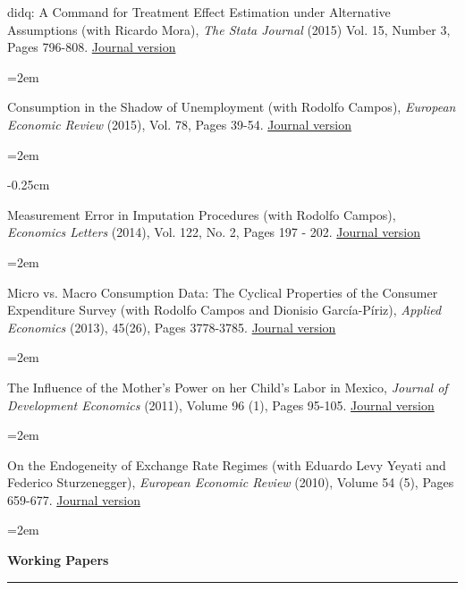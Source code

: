 \documentclass[12pt]{article}
\newcommand{\sepspace}{\vspace*{0.5em}}		%
\newcommand{\NewPart}[1]{ \vspace*{0.4cm} \noindent \large \textbf{#1}
\par \normalsize \normalfont \vspace*{-0.5cm} \noindent\rule{\textwidth}{1.8pt} \vspace*{-0.75cm} }
\newcommand{\EducationEntry}[4]{
		\noindent #1 \hfill      %
		\noindent #2 %
		\par  %
		\noindent \textit{#3} \par        %
		\noindent\hangindent=2em\hangafter=0  #4 %
		\normalsize \par}
\begin{document}
\vspace*{-0.25cm}

\EducationEntry{didq: A Command for Treatment Effect Estimation under Alternative Assumptions (with Ricardo Mora), \textit{The Stata Journal} (2015) Vol. 15, Number 3, Pages 796-808. \href{https://www.stata-journal.com/article.html?article=st0405}{Journal version}}{}{}{}

\vspace*{-0.25cm}

\EducationEntry{Consumption in the Shadow of Unemployment (with Rodolfo Campos), \textit{European Economic Review} (2015), Vol. 78, Pages 39-54. \href{https://www.sciencedirect.com/science/article/abs/pii/S0014292115000628}{Journal version}}{}{}

\vspace*{-0.25cm}

\EducationEntry{Measurement Error in Imputation Procedures (with Rodolfo Campos), \textit{Economics Letters} (2014), Vol. 122, No. 2, Pages 197 - 202.}{\href{https://ideas.repec.org/a/eee/ecolet/v122y2014i2p197-202.html}{Journal version}}{}{}

\vspace*{-0.25cm}

\EducationEntry{Micro vs. Macro Consumption Data: The Cyclical Properties of the Consumer Expenditure Survey (with Rodolfo Campos and Dionisio García-Píriz), \textit{Applied Economics} (2013), 45(26), Pages 3778-3785.}{\href{https://www.tandfonline.com/doi/full/10.1080/00036846.2012.732689}{Journal version}}{}{}

\vspace*{-0.25cm}

\EducationEntry{The Influence of the Mother's Power on her Child's Labor in Mexico, \textit{Journal of Development Economics} (2011), Volume 96 (1), Pages 95-105. \href{https://www.sciencedirect.com/science/article/abs/pii/S0304387810000738}{Journal version}}{}{}{}

\vspace*{-0.25cm}

\EducationEntry{On the Endogeneity of Exchange Rate Regimes (with Eduardo Levy Yeyati and Federico Sturzenegger), \textit{European Economic Review} (2010), Volume 54 (5), Pages 659-677.}{\href{https://www.sciencedirect.com/science/article/abs/pii/S0014292109001251}{Journal version}}{}{}

\vspace*{-0.5cm}
\NewPart{Working Papers}{}
\vspace*{0.25cm}
\end{document}

